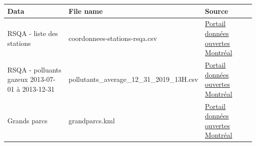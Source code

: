\documentclass[]{book}
\theoremstyle{definition}
\theoremstyle{definition}
\theoremstyle{definition}
\theoremstyle{remark}
\begin{document}
\begin{longtable}[]{@{}lll@{}}
\toprule
\begin{minipage}[b]{0.08\columnwidth}\raggedright\strut
Data\strut
\end{minipage} & \begin{minipage}[b]{0.16\columnwidth}\raggedright\strut
File name\strut
\end{minipage} & \begin{minipage}[b]{0.10\columnwidth}\raggedright\strut
Source\strut
\end{minipage}\tabularnewline
\midrule
\endhead
\begin{minipage}[t]{0.08\columnwidth}\raggedright\strut
RSQA - liste des stations\strut
\end{minipage} & \begin{minipage}[t]{0.16\columnwidth}\raggedright\strut
coordonnees-stations-rsqa.csv\strut
\end{minipage} & \begin{minipage}[t]{0.10\columnwidth}\raggedright\strut
\href{http://donnees.ville.montreal.qc.ca/dataset/rsqa-liste-des-stations/resource/29db5545-89a4-4e4a-9e95-05aa6dc2fd80}{Portail
données ouvertes Montréal}\strut
\end{minipage}\tabularnewline
\begin{minipage}[t]{0.08\columnwidth}\raggedright\strut
RSQA - polluants gazeux 2013-07-01 à 2013-12-31\strut
\end{minipage} & \begin{minipage}[t]{0.16\columnwidth}\raggedright\strut
pollutants\_average\_12\_31\_2019\_13H.csv\strut
\end{minipage} & \begin{minipage}[t]{0.10\columnwidth}\raggedright\strut
\href{http://donnees.ville.montreal.qc.ca/dataset/rsqa-polluants-gazeux/resource/26ddbd0b-47f6-4039-98b2-b32568ed01b1}{Portail
données ouvertes Montréal}\strut
\end{minipage}\tabularnewline
\begin{minipage}[t]{0.08\columnwidth}\raggedright\strut
Grands parcs\strut
\end{minipage} & \begin{minipage}[t]{0.16\columnwidth}\raggedright\strut
grandparcs.kml\strut
\end{minipage} & \begin{minipage}[t]{0.10\columnwidth}\raggedright\strut
\href{http://donnees.ville.montreal.qc.ca/dataset/grands-parcs}{Portail
données ouvertes Montréal}\strut
\end{minipage}\tabularnewline

\end{longtable}
\end{document}
